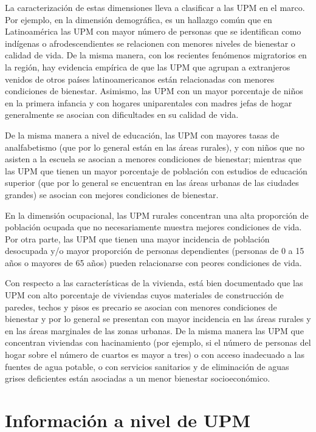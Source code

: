 \documentclass[
  12pt,
]{book}
\begin{document}
La caracterización de estas dimensiones lleva a clasificar a las UPM en el marco. Por ejemplo, en la dimensión demográfica, es un hallazgo común que en Latinoamérica las UPM con mayor número de personas que se identifican como indígenas o afrodescendientes se relacionen con menores niveles de bienestar o calidad de vida. De la misma manera, con los recientes fenómenos migratorios en la región, hay evidencia empírica de que las UPM que agrupan a extranjeros venidos de otros países latinoamericanos están relacionadas con menores condiciones de bienestar. Asimismo, las UPM con un mayor porcentaje de niños en la primera infancia y con hogares uniparentales con madres jefas de hogar generalmente se asocian con dificultades en su calidad de vida.

De la misma manera a nivel de educación, las UPM con mayores tasas de analfabetismo (que por lo general están en las áreas rurales), y con niños que no asisten a la escuela se asocian a menores condiciones de bienestar; mientras que las UPM que tienen un mayor porcentaje de población con estudios de educación superior (que por lo general se encuentran en las áreas urbanas de las ciudades grandes) se asocian con mejores condiciones de bienestar.

En la dimensión ocupacional, las UPM rurales concentran una alta proporción de población ocupada que no necesariamente muestra mejores condiciones de vida. Por otra parte, las UPM que tienen una mayor incidencia de población desocupada y/o mayor proporción de personas dependientes (personas de 0 a 15 años o mayores de 65 años) pueden relacionarse con peores condiciones de vida.

Con respecto a las características de la vivienda, está bien documentado que las UPM con alto porcentaje de viviendas cuyos materiales de construcción de paredes, techos y pisos es precario se asocian con menores condiciones de bienestar y por lo general se presentan con mayor incidencia en las áreas rurales y en las áreas marginales de las zonas urbanas. De la misma manera las UPM que concentran viviendas con hacinamiento (por ejemplo, si el número de personas del hogar sobre el número de cuartos es mayor a tres) o con acceso inadecuado a las fuentes de agua potable, o con servicios sanitarios y de eliminación de aguas grises deficientes están asociadas a un menor bienestar socioeconómico.

\hypertarget{informaciuxf3n-a-nivel-de-upm}{%
\section{Información a nivel de UPM}\label{informaciuxf3n-a-nivel-de-upm}}
\end{document}
